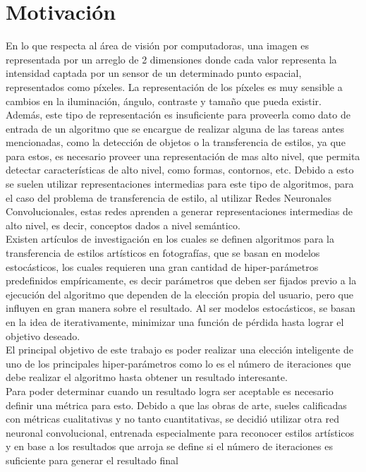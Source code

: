 \documentclass[a4paper,11pt,spanish]{book}
\begin{document}
  \section {Motivación}
    En lo que respecta al área de visión por computadoras, una imagen es representada por un arreglo de 2 dimensiones donde cada valor representa la intensidad captada por un sensor
    de un determinado punto espacial, representados como píxeles. La representación de los píxeles es muy sensible a cambios en la iluminación, ángulo, contraste y tamaño que pueda existir.\\
    Además, este tipo de representación es insuficiente para proveerla como dato de entrada de un algoritmo que se encargue de realizar alguna de las tareas antes mencionadas, como la
    detección de objetos o la transferencia de estilos, ya que para estos, es necesario proveer una representación de mas alto nivel, que permita detectar características de alto nivel,
    como formas, contornos, etc. Debido a esto se suelen utilizar representaciones intermedias para este tipo de algoritmos, para el caso del problema de transferencia de estilo,
    al utilizar Redes Neuronales Convolucionales, estas redes aprenden a generar representaciones intermedias de alto nivel, es decir, conceptos dados a nivel semántico.\\
    Existen artículos de investigación en los cuales se definen algoritmos para la transferencia de estilos artísticos en fotografías, que se basan en modelos estocásticos,
    los cuales requieren una gran cantidad de hiper-parámetros predefinidos empíricamente, es decir parámetros que deben ser fijados previo a la ejecución del algoritmo que dependen
    de la elección propia del usuario, pero que influyen en gran manera sobre el resultado. Al ser modelos estocásticos, se basan en la idea de iterativamente,
    minimizar una función de pérdida hasta lograr el objetivo deseado. \\
    El principal objetivo de este trabajo es poder realizar una elección inteligente de uno de los principales hiper-parámetros como lo es el número de iteraciones
    que debe realizar el algoritmo hasta obtener un resultado interesante. \\
    Para poder determinar cuando un resultado logra ser aceptable es necesario definir una métrica para esto.
    Debido a que las obras de arte, sueles calificadas con métricas cualitativas y no tanto cuantitativas, se decidió utilizar otra red neuronal convolucional,
    entrenada especialmente para reconocer estilos artísticos y en base a los resultados que arroja se define si el número de iteraciones es suficiente para generar el resultado final
\end{document}
